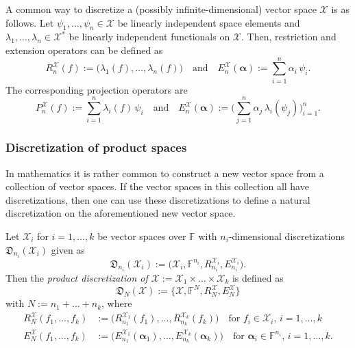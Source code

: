\documentclass[a4paper]{paper}
\newcommand{\Discr}{\mathfrak{D}}
\newcommand{\Spc}[1]{\mathscr{#1}}
\newcommand{\Field}{\mathbb{F}}
\newcommand*{\EXT}[2]{\ensuremath{E_{#1}^{#2}}}
\newcommand*{\REST}[2]{\ensuremath{R_{#1}^{#2}}}
\newcommand*{\PROJ}[2]{\ensuremath{P_{#1}^{#2}}}
\newcommand*{\RnX}{\ensuremath{\REST{n}{\Spc{X}}}}
\newcommand*{\EnX}{\ensuremath{\EXT{n}{\Spc{X}}}}
\newcommand*{\PnX}{\ensuremath{\PROJ{n}{\Spc{X}}}}
\newcommand{\valpha}{\boldsymbol{\alpha}}
\begin{document}
\begin{examp}
 A common way to discretize a (possibly infinite-dimensional) vector space $\Spc{X}$ is as follows. Let 
 $\psi_1, \ldots, \psi_n \in \Spc{X}$ be linearly independent space elements and 
 $\lambda_1, \ldots, \lambda_n \in \Spc{X}^*$ be linearly independent functionals on $\Spc{X}$. Then, restriction and 
 extension operators can be defined as
 \begin{equation*}
  \RnX(f) := \big( \lambda_1(f), \ldots, \lambda_n(f) \big) 
  \quad \text{and} \quad
  \EnX(\valpha) := \sum_{i=1}^n \alpha_i\, \psi_i.
 \end{equation*}
 The corresponding projection operators are
 \begin{equation*}
  \PnX(f) := \sum_{i=1}^n \lambda_i(f)\, \psi_i
  \quad \text{and} \quad
  \EnX(\valpha) := \bigg( \sum_{j=1}^n \alpha_j\, \lambda_i(\psi_j) \bigg)_{i=1}^n.
 \end{equation*}

\end{examp}


\subsubsection{Discretization of product spaces}
\label{subsubsec:discr:space:prod}

In mathematics it is rather common to construct a new vector space from a collection of vector spaces. If the vector 
spaces in this collection all have discretizations, then one can use these discretizations to define a natural 
discretization on the aforementioned new vector space.

\begin{definition}
 \label{def:discr:space:prod:prod_space_discr}
 Let $\Spc{X}_i$ for $i=1,\ldots,k$ be vector spaces over $\Field$ with $n_i$-dimensional discretizations 
 $\Discr_{n_i}(\Spc{X}_i)$ given as
 \begin{equation*}
  \Discr_{n_i}(\Spc{X}_i) := \bigl( \Spc{X}_i, \Field^{n_i}, \REST{n_i}{\Spc{X}_i}, \EXT{n_i}{\Spc{X}_i} \bigr). 
 \end{equation*}
 Then the \emph{product discretization of $\Spc{X} := \Spc{X}_1 \times \ldots \times \Spc{X}_k$} is defined as 
 \begin{equation*}
  \Discr_{N}(\Spc{X}):=\{\Spc{X}, \Field^N, R_{N}^{\Spc{X}}, E_{N}^{\Spc{X}} \}
 \end{equation*}
 with $N := n_1 + \ldots + n_k$, where
 \begin{align*}
  \REST{N}{\Spc{X}}(f_1,\ldots,f_k) &:= \bigl( \REST{n_1}{\Spc{X}_1}(f_1),\ldots,\REST{n_k}{\Spc{X}_k}(f_k) \bigr)
  \quad\text{for $f_i\in \Spc{X}_i$, $i=1,\ldots,k$} \\
  \EXT{N}{\Spc{X}}(f_1,\ldots,f_k) &:= \bigl( \EXT{n_1}{\Spc{X}_1}(\valpha_1),\ldots,\EXT{n_k}{\Spc{X}_k}(\valpha_k) 
  \bigr)
  \quad\text{for $\valpha_i\in \Field^{n_i}$, $i=1,\ldots,k$.}
 \end{align*}
\end{definition}
\end{document}
